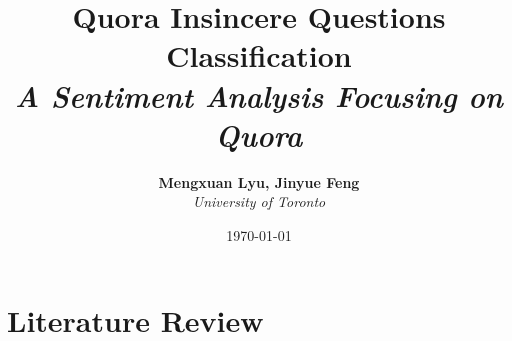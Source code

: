 \documentclass[12pt]{diazessay} %
\title{\textbf{Quora Insincere Questions Classification} \\ {\Large\itshape A Sentiment Analysis Focusing on Quora}} %
\author{\textbf{Mengxuan Lyu, Jinyue Feng} \\ \textit{University of Toronto}} %
\date{\today} %
\begin{document}
\maketitle %






\doublespacing %
\section*{Literature Review}
\citep{devlin2018bert}






\end{document}
